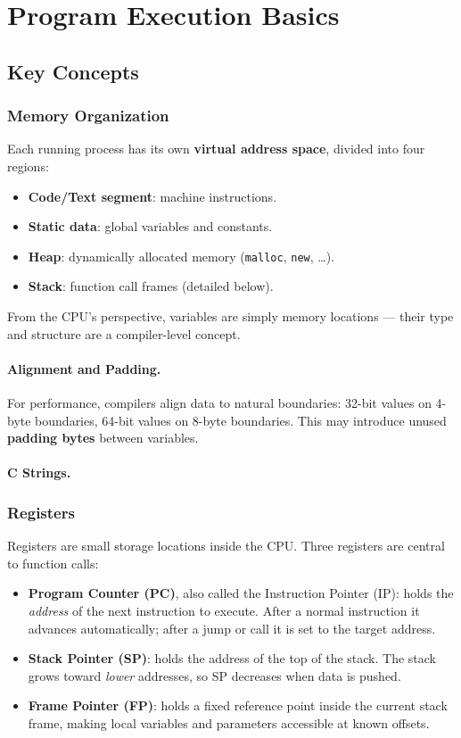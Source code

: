\section{Program Execution Basics}
\subsection{Key Concepts}
\subsubsection{Memory Organization}
Each running process has its own \textbf{virtual address space}, divided into four regions:
\begin{itemize}
\item \textbf{Code/Text segment}: machine instructions.
\item \textbf{Static data}: global variables and constants.
\item \textbf{Heap}: dynamically allocated memory (\texttt{malloc}, \texttt{new}, \ldots).
\item \textbf{Stack}: function call frames (detailed below).
\end{itemize}
From the CPU's perspective, variables are simply memory locations — their type and structure are a compiler-level concept.
\paragraph{Alignment and Padding.}
For performance, compilers align data to natural boundaries: 32-bit values on 4-byte boundaries, 64-bit values on 8-byte boundaries. This may introduce unused \textbf{padding bytes} between variables.
\paragraph{C Strings.}
\subsubsection{Registers}
Registers are small storage locations inside the CPU. Three registers are central to function calls:
\begin{itemize}
\item \textbf{Program Counter (PC)}, also called the Instruction Pointer (IP): holds the \emph{address} of the next instruction to execute. After a normal instruction it advances automatically; after a jump or call it is set to the target address.
\item \textbf{Stack Pointer (SP)}: holds the address of the top of the stack. The stack grows toward \emph{lower} addresses, so SP decreases when data is pushed.
\item \textbf{Frame Pointer (FP)}: holds a fixed reference point inside the current stack frame, making local variables and parameters accessible at known offsets.
\end{itemize}
